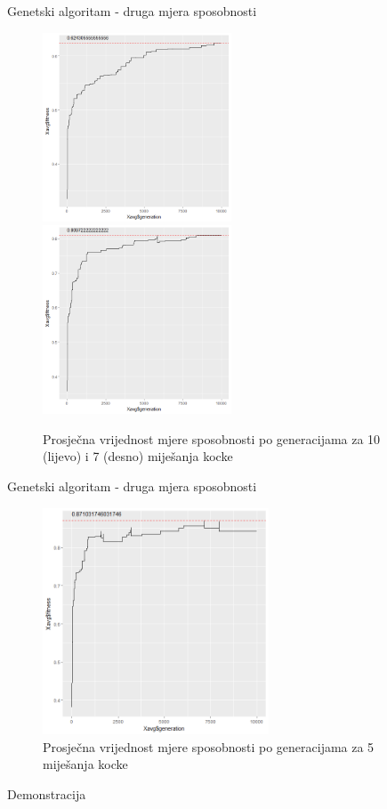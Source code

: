\documentclass{beamer}
\begin{document}
  \begin{frame}{Genetski algoritam - druga mjera sposobnosti}
  		\begin{figure}[h]
			\centering
			\includegraphics[width=0.5\textwidth]{../../results/cubies_fitness/10_scrambles/cross0,5greedy10mut20.png}
			\includegraphics[width=0.5\textwidth]{../../results/cubies_fitness/7_scrambles/cross0,5greedy10mut20.png}
			\caption{Prosječna vrijednost mjere sposobnosti po generacijama za 10 (lijevo) i 7 (desno) miješanja kocke }
		\end{figure}
  \end{frame}  
    
  \begin{frame}{Genetski algoritam - druga mjera sposobnosti}
  		\begin{figure}[h]
			\centering
			\includegraphics[width=0.6\textwidth]{../../results/cubies_fitness/5_scrambles/cross0,5greedy10mut20.png}
			\caption{Prosječna vrijednost mjere sposobnosti po generacijama za 5 miješanja kocke }
		\end{figure}
  \end{frame}
  
  \begin{frame}{Demonstracija}
  \end{frame}
    
\end{document}

